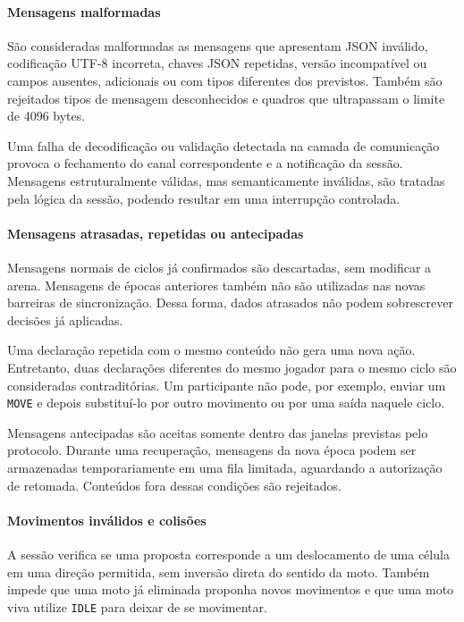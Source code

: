 \documentclass[11pt,a4paper]{article}
\begin{document}
\paragraph{Mensagens malformadas}

São consideradas malformadas as mensagens que apresentam JSON inválido, codificação UTF-8 incorreta, chaves JSON repetidas, versão incompatível ou campos ausentes, adicionais ou com tipos diferentes dos previstos. Também são rejeitados tipos de mensagem desconhecidos e quadros que ultrapassam o limite de 4096 bytes.

Uma falha de decodificação ou validação detectada na camada de comunicação provoca o fechamento do canal correspondente e a notificação da sessão. Mensagens estruturalmente válidas, mas semanticamente inválidas, são tratadas pela lógica da sessão, podendo resultar em uma interrupção controlada.

\paragraph{Mensagens atrasadas, repetidas ou antecipadas}

Mensagens normais de ciclos já confirmados são descartadas, sem modificar a arena. Mensagens de épocas anteriores também não são utilizadas nas novas barreiras de sincronização. Dessa forma, dados atrasados não podem sobrescrever decisões já aplicadas.

Uma declaração repetida com o mesmo conteúdo não gera uma nova ação. Entretanto, duas declarações diferentes do mesmo jogador para o mesmo ciclo são consideradas contraditórias. Um participante não pode, por exemplo, enviar um \texttt{MOVE} e depois substituí-lo por outro movimento ou por uma saída naquele ciclo.

Mensagens antecipadas são aceitas somente dentro das janelas previstas pelo protocolo. Durante uma recuperação, mensagens da nova época podem ser armazenadas temporariamente em uma fila limitada, aguardando a autorização de retomada. Conteúdos fora dessas condições são rejeitados.

\paragraph{Movimentos inválidos e colisões}

A sessão verifica se uma proposta corresponde a um deslocamento de uma célula em uma direção permitida, sem inversão direta do sentido da moto. Também impede que uma moto já eliminada proponha novos movimentos e que uma moto viva utilize \texttt{IDLE} para deixar de se movimentar.
\end{document}
